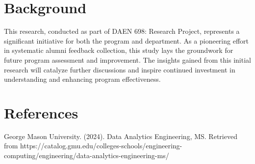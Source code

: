 \documentclass[12pt,a4paper]{article}
\begin{document}
\begin{appendices}
\section{Background}
This research, conducted as part of DAEN 698: Research Project, represents a significant initiative for both the program and department. As a pioneering effort in systematic alumni feedback collection, this study lays the groundwork for future program assessment and improvement. The insights gained from this initial research will catalyze further discussions and inspire continued investment in understanding and enhancing program effectiveness.

\section{References}
\begin{thebibliography}{9}
     George Mason University. (2024). Data Analytics Engineering, MS. Retrieved from https://catalog.gmu.edu/colleges-schools/engineering-computing/engineering/data-analytics-engineering-ms/
    \end{thebibliography}
\end{appendices}
\end{document}
